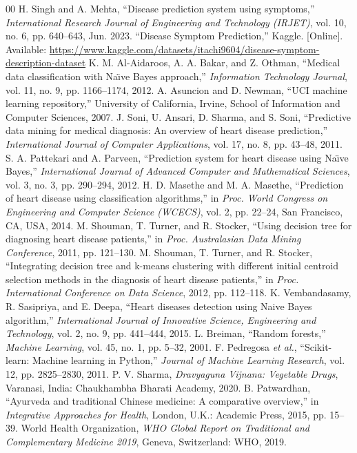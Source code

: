 \documentclass[conference]{IEEEtran}
\begin{document}
\begin{thebibliography}{00}
 H. Singh and A. Mehta, ``Disease prediction system using symptoms,'' \textit{International Research Journal of Engineering and Technology (IRJET)}, vol. 10, no. 6, pp. 640--643, Jun. 2023.
 ``Disease Symptom Prediction,'' Kaggle. [Online]. Available: \url{https://www.kaggle.com/datasets/itachi9604/disease-symptom-description-dataset}
 K. M. Al-Aidaroos, A. A. Bakar, and Z. Othman, ``Medical data classification with Na{\"\i}ve Bayes approach,'' \textit{Information Technology Journal}, vol. 11, no. 9, pp. 1166--1174, 2012.
 A. Asuncion and D. Newman, ``UCI machine learning repository,'' University of California, Irvine, School of Information and Computer Sciences, 2007.
 J. Soni, U. Ansari, D. Sharma, and S. Soni, ``Predictive data mining for medical diagnosis: An overview of heart disease prediction,'' \textit{International Journal of Computer Applications}, vol. 17, no. 8, pp. 43--48, 2011.
 S. A. Pattekari and A. Parveen, ``Prediction system for heart disease using Na{\"\i}ve Bayes,'' \textit{International Journal of Advanced Computer and Mathematical Sciences}, vol. 3, no. 3, pp. 290--294, 2012.
 H. D. Masethe and M. A. Masethe, ``Prediction of heart disease using classification algorithms,'' in \textit{Proc. World Congress on Engineering and Computer Science (WCECS)}, vol. 2, pp. 22--24, San Francisco, CA, USA, 2014.
 M. Shouman, T. Turner, and R. Stocker, ``Using decision tree for diagnosing heart disease patients,'' in \textit{Proc. Australasian Data Mining Conference}, 2011, pp. 121--130.
 M. Shouman, T. Turner, and R. Stocker, ``Integrating decision tree and k-means clustering with different initial centroid selection methods in the diagnosis of heart disease patients,'' in \textit{Proc. International Conference on Data Science}, 2012, pp. 112--118.
 K. Vembandasamy, R. Sasipriya, and E. Deepa, ``Heart diseases detection using Naive Bayes algorithm,'' \textit{International Journal of Innovative Science, Engineering and Technology}, vol. 2, no. 9, pp. 441--444, 2015.
 L. Breiman, ``Random forests,'' \textit{Machine Learning}, vol. 45, no. 1, pp. 5--32, 2001.
 F. Pedregosa \textit{et al.}, ``Scikit-learn: Machine learning in Python,'' \textit{Journal of Machine Learning Research}, vol. 12, pp. 2825--2830, 2011.
 P. V. Sharma, \textit{Dravyaguna Vijnana: Vegetable Drugs}, Varanasi, India: Chaukhambha Bharati Academy, 2020.
 B. Patwardhan, ``Ayurveda and traditional Chinese medicine: A comparative overview,'' in \textit{Integrative Approaches for Health}, London, U.K.: Academic Press, 2015, pp. 15--39.
 World Health Organization, \textit{WHO Global Report on Traditional and Complementary Medicine 2019}, Geneva, Switzerland: WHO, 2019.
\end{thebibliography}
\end{document}
